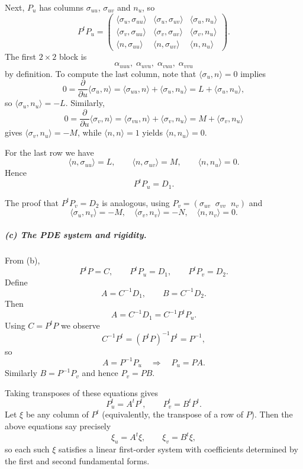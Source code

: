 \documentclass[12pt,a4paper]{article}
\theoremstyle{plain}
\theoremstyle{definition}      %
\begin{document}
	Next, $P_u$ has columns $\sigma_{uu}$, $\sigma_{uv}$ and $n_u$, so
	\[
	P^tP_u=
	\begin{pmatrix}
		\langle\sigma_u,\sigma_{uu}\rangle &
		\langle\sigma_u,\sigma_{uv}\rangle &
		\langle\sigma_u,n_u\rangle\\[2pt]
		\langle\sigma_v,\sigma_{uu}\rangle &
		\langle\sigma_v,\sigma_{uv}\rangle &
		\langle\sigma_v,n_u\rangle\\[2pt]
		\langle n,\sigma_{uu}\rangle &
		\langle n,\sigma_{uv}\rangle &
		\langle n,n_u\rangle
	\end{pmatrix}.
	\]
	The first $2\times2$ block is
	\[
	\alpha_{uuu},\;\alpha_{uvu},\;\alpha_{vuu},\;\alpha_{vvu}
	\]
	by definition.  To compute the last column, note that
	$\langle\sigma_u,n\rangle=0$ implies
	\[
	0 = \frac{\partial}{\partial u}\langle\sigma_u,n\rangle
	= \langle\sigma_{uu},n\rangle + \langle\sigma_u,n_u\rangle
	= L + \langle\sigma_u,n_u\rangle,
	\]
	so $\langle\sigma_u,n_u\rangle=-L$.  Similarly,
	\[
	0 = \frac{\partial}{\partial u}\langle\sigma_v,n\rangle
	= \langle\sigma_{vu},n\rangle + \langle\sigma_v,n_u\rangle
	= M + \langle\sigma_v,n_u\rangle
	\]
	gives $\langle\sigma_v,n_u\rangle=-M$, while
	$\langle n,n\rangle=1$ yields $\langle n,n_u\rangle=0$.
	
	For the last row we have
	\[
	\langle n,\sigma_{uu}\rangle = L,\qquad
	\langle n,\sigma_{uv}\rangle = M,\qquad
	\langle n,n_u\rangle = 0.
	\]
	Hence
	\[
	P^tP_u = D_1.
	\]
	
	The proof that $P^tP_v=D_2$ is analogous, using $P_v=(\sigma_{uv}\;\;\sigma_{vv}\;\;n_v)$ and
	\[
	\langle\sigma_u,n_v\rangle=-M,\quad
	\langle\sigma_v,n_v\rangle=-N,\quad
	\langle n,n_v\rangle=0.
	\]
	
	\subparagraph{(c) The PDE system and rigidity.}
	From (b),
	\[
	P^tP=C,\qquad P^tP_u=D_1,\qquad P^tP_v=D_2.
	\]
	Define
	\[
	A=C^{-1}D_1,\qquad B=C^{-1}D_2.
	\]
	Then
	\[
	A=C^{-1}D_1 = C^{-1}P^tP_u.
	\]
	Using $C=P^tP$ we observe
	\[
	C^{-1}P^t = (P^tP)^{-1}P^t = P^{-1},
	\]
	so
	\[
	A = P^{-1}P_u \quad\Rightarrow\quad P_u = P A.
	\]
	Similarly $B=P^{-1}P_v$ and hence $P_v = P B$.
	
	Taking transposes of these equations gives
	\[
	P_u^t = A^tP^t,\qquad P_v^t = B^tP^t.
	\]
	Let $\xi$ be any column of $P^t$ (equivalently, the transpose of a row of $P$).
	Then the above equations say precisely
	\[
	\xi_u=A^t\xi,\qquad \xi_v=B^t\xi,
	\]
	so each such $\xi$ satisfies a linear first-order system with coefficients
	determined by the first and second fundamental forms.
	
\end{document}
